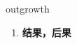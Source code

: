 
\begin{frame}
{\huge outgrowth}
\begin{center}
\begin{enumerate}\Large
  \item \textbf{结果，后果}
\end{enumerate}
\end{center}
\end{frame}
